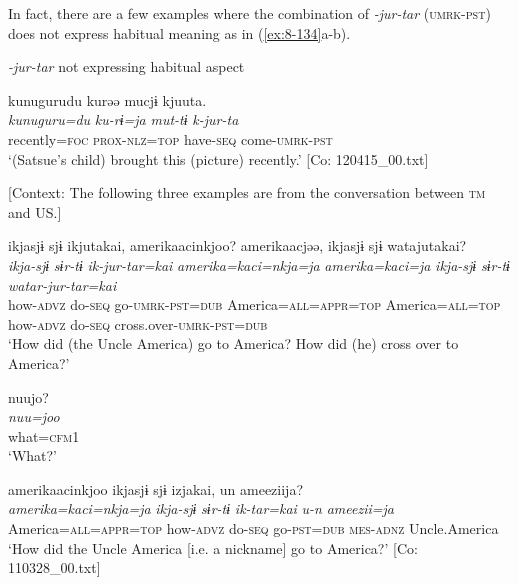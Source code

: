   In fact, there are a few examples where the combination of \textit{-jur-tar} (\textsc{umrk}-\textsc{pst}) does not express habitual meaning as in (\ref{ex:8-134}a-b).

\ea\label{ex:8-134}
  \textit{-jur-tar} not expressing habitual aspect

\ea
{\TM}
\glll  kunugurudu  kurəə  mucjɨ  kjuuta.\\
\textit{kunuguru=du}  \textit{ku-rɨ=ja}  \textit{mut-tɨ}  \textit{k-jur-ta}\\
recently=\textsc{foc}  \textsc{prox}-\textsc{nlz}=\textsc{top}  have-\textsc{seq}  come-\textsc{umrk}-\textsc{pst}\\
\glt ‘(Satsue’s child) brought this (picture) recently.’ [Co: 120415\_00.txt]

\ex {}[Context: The following three examples are from the conversation between \textsc{tm} and US.]

{\TM}
\glll  ikjasjɨ  sjɨ  ikjutakai,  amerikaacinkjoo?    amerikaacjəə,  ikjasjɨ  sjɨ  watajutakai?
\\
\textit{ikja-sjɨ}  \textit{sɨr-tɨ}  \textit{ik-jur-tar=kai}  \textit{amerika=kaci=nkja=ja}    \textit{amerika=kaci=ja}  \textit{ikja-sjɨ}  \textit{sɨr-tɨ}  \textit{watar-jur-tar=kai}\\
how-\textsc{advz}  do-\textsc{seq}  go-\textsc{umrk}-\textsc{pst}=\textsc{dub}  America=\textsc{all}=\textsc{appr}=\textsc{top}  America=\textsc{all}=\textsc{top}  how-\textsc{advz}  do-\textsc{seq}  cross.over-\textsc{umrk}-\textsc{pst}=\textsc{dub}\\
\glt ‘How did (the Uncle America) go to America? How did (he) cross over to America?’

\ex
{\US}
\glll   nuujo?\\
\textit{nuu=joo}\\
what=\textsc{cfm1}\\
\glt ‘What?’

\ex
{\TM}
\glll  amerikaacinkjoo  ikjasjɨ  sjɨ  izjakai,      un  ameeziija?\\
\textit{amerika=kaci=nkja=ja}  \textit{ikja-sjɨ}  \textit{sɨr-tɨ}  \textit{ik-tar=kai}      \textit{u-n}  \textit{ameezii=ja}\\
America=\textsc{all}=\textsc{appr}=\textsc{top}  how-\textsc{advz}  do-\textsc{seq}  go-\textsc{pst}=\textsc{dub}   \textsc{mes}-\textsc{adnz}  Uncle.America\\
\glt ‘How did the Uncle America [i.e. a nickname] go to America?’ [Co: 110328\_00.txt]
\z
\z

